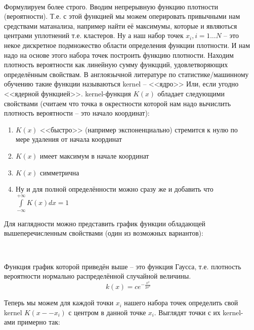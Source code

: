 \documentclass[11pt]{article}
\begin{document}
    \\ Формулируем более строго. Вводим непрерывную функцию
плотности (вероятности). Т.е. с этой функцией мы можем оперировать
привычными нам средствами матанализа, например найти её максимумы,
которые и являються центрами уплотнений т.е. кластеров. Ну а наш набор
точек $x_i, i = 1 \ldots N$ -- это некое дискретное подмножество области
определения функции плотности. И нам надо на основе этого набора точек
построить функцию плотности. Находим плотность вероятности как линейную
сумму функцций, удовлетворяющих определённым свойствам. В англоязычной
литературе по статистике/машинному обучению такие функции называються
kernel -- <<ядро>> Или, если угодно <<ядерной функцией>>.
kernel-функция $K(x)$ обладает следующими свойствами (считаем что точка
в окрестности которой нам надо вычислить плотность вероятности -- это
начало координат):

\begin{enumerate}
\item $K(x)$ <<быстро>> (например экспоненциально) стремится к нулю по мере удаления от начала координат
\item $K(x)$ имеет максимум в начале координат
\item $K(x)$ симметрична
\item Ну и для полной определённости можно сразу же и добавить что $\int\limits_{-\infty}^{+\infty}K(x)dx = 1$
\end{enumerate}

Для наглядности можно представить график функции обладающей
вышеперечисленным свойствами (один из возможных вариантов):
    \begin{center}
    \end{center}
    { \hspace*{\fill} \\}
    
    Функция график которой приведён выше -- это функция Гаусса, т.е.
плотность вероятности нормально распределённой случайной величины.
$$
k(x) = ce^{-\frac{x^2}{2\sigma^2}}
$$

Теперь мы можем для каждой точки $x_i$ нашего набора точек определить
свой kernel $K(x -- x_i)$ с центром в данной точке $x_i$. Выглядят точки
с их kernel-ами примерно так:


    \begin{center}
    \end{center}
    { \hspace*{\fill} \\}
    
\end{document}
